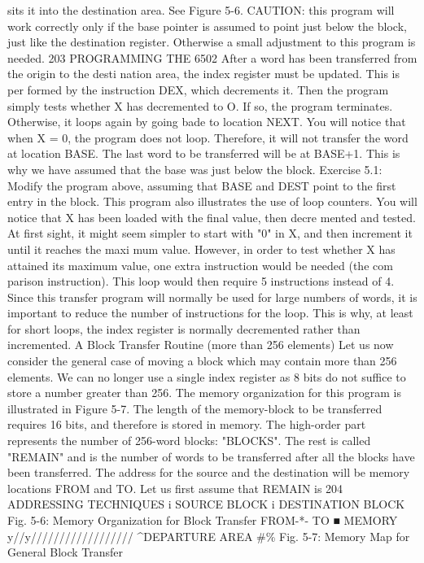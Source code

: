 \documentclass{book}
\begin{document}
sits it into the destination area. See Figure 5-6.
CAUTION: this program will work correctly only if the base
pointer is assumed to point just below the block, just like the
destination register. Otherwise a small adjustment to this
program is needed.
203
PROGRAMMING THE 6502
After a word has been transferred from the origin to the desti
nation area, the index register must be updated. This is per
formed by the instruction DEX, which decrements it. Then the
program simply tests whether X has decremented to O. If so, the
program terminates. Otherwise, it loops again by going bade to
location NEXT.
You will notice that when X = 0, the program does not loop.
Therefore, it will not transfer the word at location BASE. The last
word to be transferred will be at BASE+1. This is why we have
assumed that the base was just below the block.
Exercise 5.1: Modify the program above, assuming that
BASE and DEST point to the first entry in the block.
This program also illustrates the use of loop counters. You will
notice that X has been loaded with the final value, then decre
mented and tested. At first sight, it might seem simpler to start
with "0" in X, and then increment it until it reaches the maxi
mum value. However, in order to test whether X has attained its
maximum value, one extra instruction would be needed (the com
parison instruction). This loop would then require 5 instructions
instead of 4. Since this transfer program will normally be used for
large numbers of words, it is important to reduce the number of
instructions for the loop. This is why, at least for short loops, the
index register is normally decremented rather than incremented.
A Block Transfer Routine (more than 256 elements)
Let us now consider the general case of moving a block which
may contain more than 256 elements. We can no longer use a
single index register as 8 bits do not suffice to store a number
greater than 256. The memory organization for this program is
illustrated in Figure 5-7. The length of the memory-block to be
transferred requires 16 bits, and therefore is stored in memory.
The high-order part represents the number of 256-word blocks:
"BLOCKS". The rest is called "REMAIN" and is the number of
words to be transferred after all the blocks have been transferred.
The address for the source and the destination will be memory
locations FROM and TO. Let us first assume that REMAIN is
204
ADDRESSING TECHNIQUES
i SOURCE BLOCK
i DESTINATION BLOCK
Fig. 5-6: Memory Organization for Block Transfer
FROM-*-
TO ■
MEMORY
y//y//////////////////
^DEPARTURE AREA #\%
Fig. 5-7: Memory Map for General Block Transfer
\end{document}
